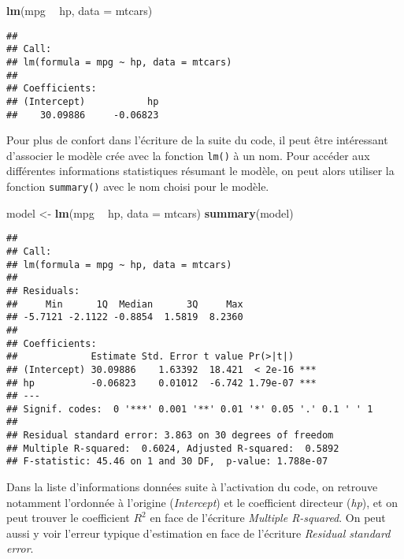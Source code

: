 \documentclass[
  french,
]{book}
\newenvironment{Shaded}{\begin{snugshade}}{\end{snugshade}}
\newcommand{\DataTypeTok}[1]{\textcolor[rgb]{0.13,0.29,0.53}{#1}}
\newcommand{\KeywordTok}[1]{\textcolor[rgb]{0.13,0.29,0.53}{\textbf{#1}}}
\newcommand{\NormalTok}[1]{#1}
\newcommand{\OperatorTok}[1]{\textcolor[rgb]{0.81,0.36,0.00}{\textbf{#1}}}
\newcommand{\StringTok}[1]{\textcolor[rgb]{0.31,0.60,0.02}{#1}}
\begin{document}
\begin{Shaded}
\begin{Highlighting}[]
\KeywordTok{lm}\NormalTok{(mpg }\OperatorTok{~}\StringTok{ }\NormalTok{hp, }\DataTypeTok{data =}\NormalTok{ mtcars)}
\end{Highlighting}
\end{Shaded}

\begin{verbatim}
## 
## Call:
## lm(formula = mpg ~ hp, data = mtcars)
## 
## Coefficients:
## (Intercept)           hp  
##    30.09886     -0.06823
\end{verbatim}

Pour plus de confort dans l'écriture de la suite du code, il peut être intéressant d'associer le modèle crée avec la fonction \texttt{lm()} à un nom. Pour accéder aux différentes informations statistiques résumant le modèle, on peut alors utiliser la fonction \texttt{summary()} avec le nom choisi pour le modèle.

\begin{Shaded}
\begin{Highlighting}[]
\NormalTok{model <-}\StringTok{ }\KeywordTok{lm}\NormalTok{(mpg }\OperatorTok{~}\StringTok{ }\NormalTok{hp, }\DataTypeTok{data =}\NormalTok{ mtcars)}
\KeywordTok{summary}\NormalTok{(model)}
\end{Highlighting}
\end{Shaded}

\begin{verbatim}
## 
## Call:
## lm(formula = mpg ~ hp, data = mtcars)
## 
## Residuals:
##     Min      1Q  Median      3Q     Max 
## -5.7121 -2.1122 -0.8854  1.5819  8.2360 
## 
## Coefficients:
##             Estimate Std. Error t value Pr(>|t|)    
## (Intercept) 30.09886    1.63392  18.421  < 2e-16 ***
## hp          -0.06823    0.01012  -6.742 1.79e-07 ***
## ---
## Signif. codes:  0 '***' 0.001 '**' 0.01 '*' 0.05 '.' 0.1 ' ' 1
## 
## Residual standard error: 3.863 on 30 degrees of freedom
## Multiple R-squared:  0.6024, Adjusted R-squared:  0.5892 
## F-statistic: 45.46 on 1 and 30 DF,  p-value: 1.788e-07
\end{verbatim}

Dans la liste d'informations données suite à l'activation du code, on retrouve notamment l'ordonnée à l'origine (\emph{Intercept}) et le coefficient directeur (\emph{hp}), et on peut trouver le coefficient \(R^2\) en face de l'écriture \emph{Multiple R-squared}. On peut aussi y voir l'erreur typique d'estimation en face de l'écriture \emph{Residual standard error}.
\end{document}
